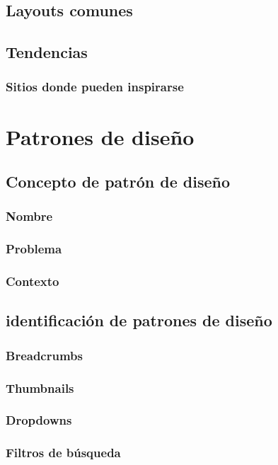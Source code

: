 \documentclass[12pt]{report}
\begin{document}
		\subsection{Layouts comunes}
		\subsection{Tendencias}
			\subsubsection{Sitios donde pueden inspirarse}
	\section{Patrones de diseño}
		\subsection{Concepto de patrón de diseño}
			\subsubsection{Nombre}
			\subsubsection{Problema}
			\subsubsection{Contexto}
		\subsection{identificación de patrones de diseño}
			\subsubsection{Breadcrumbs}
			\subsubsection{Thumbnails}
			\subsubsection{Dropdowns}
			\subsubsection{Filtros de búsqueda}
\end{document}
